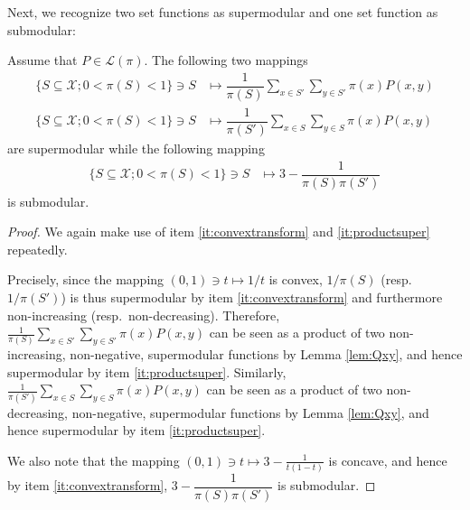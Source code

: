 \documentclass[EJP]{ejpecp} %
\begin{document}
Next, we recognize two set functions as supermodular and one set function as submodular:
\begin{lemma}
    Assume that $P \in \mathcal{L}(\pi)$. The following two mappings
    \begin{align*}
        \{S \subseteq \mathcal{X}; 0 < \pi(S) < 1\} \ni S &\mapsto \dfrac{1}{\pi(S)} \sum_{x \in S'} \sum_{y \in S'} \pi(x) P(x,y) \\
        \{S \subseteq \mathcal{X}; 0 < \pi(S) < 1\} \ni S &\mapsto \dfrac{1}{\pi(S')} \sum_{x \in S} \sum_{y \in S} \pi(x) P(x,y)
    \end{align*}
    are supermodular while the following mapping
    \begin{align*}
        \{S \subseteq \mathcal{X}; 0 < \pi(S) < 1\} \ni S &\mapsto 3 - \dfrac{1}{\pi(S)\pi(S')}
    \end{align*}
    is submodular.
\end{lemma}

\begin{proof}
    We again make use of item \eqref{it:convextransform} and \eqref{it:productsuper} repeatedly. 
    
    Precisely, since the mapping $(0,1) \ni t \mapsto 1/t$ is convex, $1/\pi(S)$ (resp.~$1/\pi(S')$) is thus supermodular by item \eqref{it:convextransform} and furthermore non-increasing (resp.~non-decreasing). Therefore, $\frac{1}{\pi(S)} \sum_{x \in S'} \sum_{y \in S'} \pi(x) P(x,y)$ can be seen as a product of two non-increasing, non-negative, supermodular functions by Lemma \ref{lem:Qxy}, and hence supermodular by item \eqref{it:productsuper}. Similarly, $\frac{1}{\pi(S')} \sum_{x \in S} \sum_{y \in S} \pi(x) P(x,y)$ can be seen as a product of two non-decreasing, non-negative, supermodular functions by Lemma \ref{lem:Qxy}, and hence supermodular by item \eqref{it:productsuper}.

    We also note that the mapping $(0,1) \ni t \mapsto 3 - \frac{1}{t(1-t)}$ is concave, and hence by item \eqref{it:convextransform}, $3 - \dfrac{1}{\pi(S)\pi(S')}$ is submodular.
\end{proof}
\end{document}
